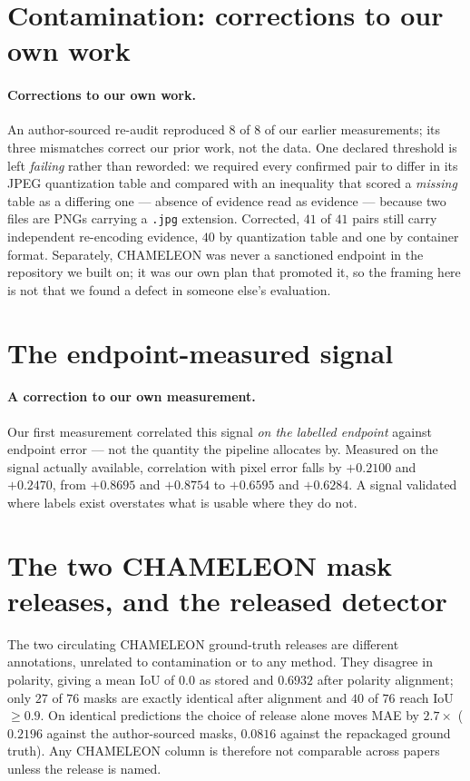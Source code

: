 \documentclass{article} %
\begin{document}
\section{Contamination: corrections to our own work}

\paragraph{Corrections to our own work.} An author-sourced re-audit reproduced $8$ of $8$ of our
earlier measurements; its three mismatches correct our prior work, not the data. One declared
threshold is left \emph{failing} rather than reworded: we required every confirmed pair to differ in
its JPEG quantization table and compared with an inequality that scored a \emph{missing} table as a
differing one --- absence of evidence read as evidence --- because two files are PNGs carrying a
\texttt{.jpg} extension. Corrected, $41$ of $41$ pairs still carry independent re-encoding evidence,
$40$ by quantization table and one by container format. Separately, CHAMELEON was never a sanctioned
endpoint in the repository we built on; it was our own plan that promoted it, so the framing here is
not that we found a defect in someone else's evaluation.


\section{The endpoint-measured signal}

\paragraph{A correction to our own measurement.} Our first measurement correlated this signal \emph{on
the labelled endpoint} against endpoint error --- not the quantity the pipeline allocates by. Measured
on the signal actually available, correlation with pixel error falls by $+0.2100$ and $+0.2470$, from
$+0.8695$ and $+0.8754$ to $+0.6595$ and $+0.6284$. A signal validated where labels exist overstates
what is usable where they do not.


\section{The two CHAMELEON mask releases, and the released detector}
\label{app:masks}

The two circulating CHAMELEON ground-truth releases are different annotations, unrelated to
contamination or to any method. They disagree in polarity, giving a mean IoU of $0.0$ as stored and
$0.6932$ after polarity alignment; only $27$ of $76$ masks are exactly identical after alignment and
$40$ of $76$ reach IoU $\geq 0.9$. On identical predictions the choice of release alone moves MAE by
$2.7\times$ ($0.2196$ against the author-sourced masks, $0.0816$ against the repackaged ground truth).
Any CHAMELEON column is therefore not comparable across papers unless the release is named.
\end{document}
